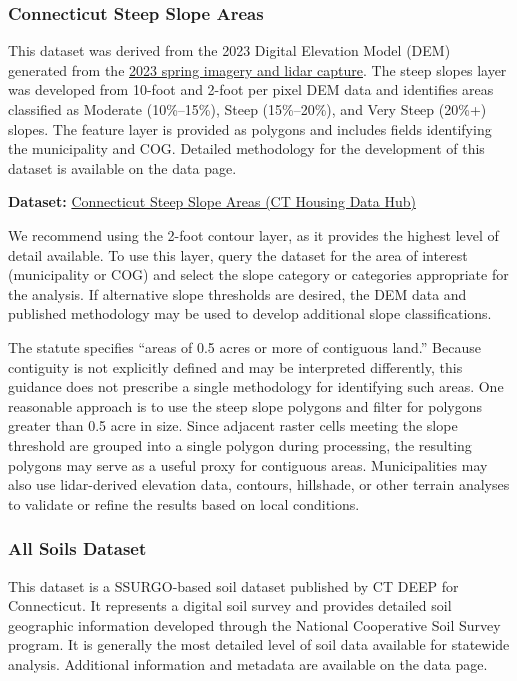 \documentclass[
  letterpaper,
  DIV=11,
  numbers=noendperiod]{scrreprt}
\begin{document}
\subsubsection{Connecticut Steep Slope
Areas}\label{sec-connecticut-steep-slope-areas}

This dataset was derived from the 2023 Digital Elevation Model (DEM)
generated from the
\href{https://maps.cteco.uconn.edu/data/flight2023/}{2023 spring imagery
and lidar capture}. The steep slopes layer was developed from 10-foot
and 2-foot per pixel DEM data and identifies areas classified as
Moderate (10\%--15\%), Steep (15\%--20\%), and Very Steep (20\%+)
slopes. The feature layer is provided as polygons and includes fields
identifying the municipality and COG. Detailed methodology for the
development of this dataset is available on the data page.

\textbf{Dataset:}
\href{https://housingmaps.ct.gov/maps/64e698b122464435a56172f576f3d2a6/about}{Connecticut
Steep Slope Areas (CT Housing Data Hub)}

We recommend using the 2-foot contour layer, as it provides the highest
level of detail available. To use this layer, query the dataset for the
area of interest (municipality or COG) and select the slope category or
categories appropriate for the analysis. If alternative slope thresholds
are desired, the DEM data and published methodology may be used to
develop additional slope classifications.

The statute specifies ``areas of 0.5 acres or more of contiguous land.''
Because contiguity is not explicitly defined and may be interpreted
differently, this guidance does not prescribe a single methodology for
identifying such areas. One reasonable approach is to use the steep
slope polygons and filter for polygons greater than 0.5 acre in size.
Since adjacent raster cells meeting the slope threshold are grouped into
a single polygon during processing, the resulting polygons may serve as
a useful proxy for contiguous areas. Municipalities may also use
lidar-derived elevation data, contours, hillshade, or other terrain
analyses to validate or refine the results based on local conditions.

\subsubsection{All Soils Dataset}\label{sec-all-soils}

This dataset is a SSURGO-based soil dataset published by CT DEEP for
Connecticut. It represents a digital soil survey and provides detailed
soil geographic information developed through the National Cooperative
Soil Survey program. It is generally the most detailed level of soil
data available for statewide analysis. Additional information and
metadata are available on the data page.
\end{document}
